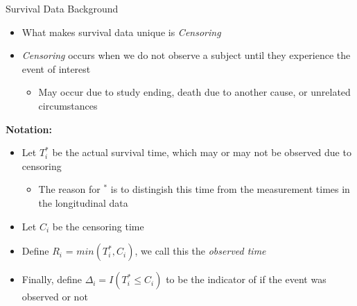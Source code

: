 \documentclass[
  ignorenonframetext,
]{beamer}
\providecommand{\tightlist}{%
  \setlength{\itemsep}{0pt}\setlength{\parskip}{0pt}}
\begin{document}
\begin{frame}{Survival Data Background}
\protect\hypertarget{survival-data-background}{}
\begin{itemize}
\tightlist
\item
  What makes survival data unique is \emph{Censoring}
\item
  \emph{Censoring} occurs when we do not observe a subject until they
  experience the event of interest

  \begin{itemize}
  \tightlist
  \item
    May occur due to study ending, death due to another cause, or
    unrelated circumstances
  \end{itemize}
\end{itemize}

\textbf{Notation:}

\begin{itemize}
\tightlist
\item
  Let \(T_i^*\) be the actual survival time, which may or may not be
  observed due to censoring

  \begin{itemize}
  \tightlist
  \item
    The reason for \(^*\) is to distingish this time from the
    measurement times in the longitudinal data
  \end{itemize}
\item
  Let \(C_i\) be the censoring time
\item
  Define \(R_i\) = \(min(T_i^*, C_i)\), we call this the \emph{observed
  time}
\item
  Finally, define \(\Delta_i = I(T_i^* \leq C_i)\) to be the indicator
  of if the event was observed or not
\end{itemize}
\end{frame}
\end{document}
